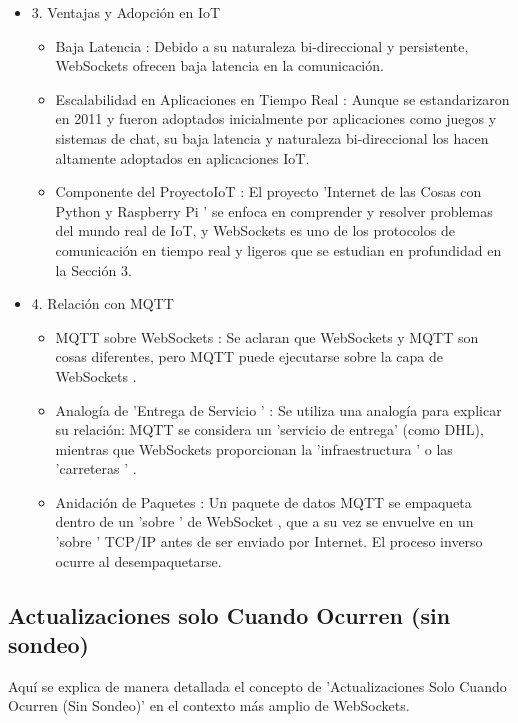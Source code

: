 \documentclass{report}
\begin{document}
\begin{itemize}
    \item 3. Ventajas y Adopción en IoT
    \begin{itemize}
        \item  Baja Latencia : Debido a su naturaleza bi-direccional y persistente, WebSockets ofrecen  baja latencia  en la comunicación.
        \item  Escalabilidad en Aplicaciones en Tiempo Real : Aunque se estandarizaron en 2011 y fueron adoptados inicialmente por aplicaciones 
        como juegos y sistemas de chat, su  baja latencia y naturaleza bi-direccional  los hacen altamente adoptados en aplicaciones IoT.
        \item  Componente del ProyectoIoT : El proyecto  'Internet de las Cosas con Python y Raspberry Pi ' se enfoca en comprender y resolver 
        problemas del mundo real de IoT, y WebSockets es uno de los  protocolos de comunicación en tiempo real y ligeros  que se estudian en 
        profundidad en la Sección 3.
    \end{itemize}

    \item 4. Relación con MQTT
    \begin{itemize}
        \item  MQTT sobre WebSockets : Se aclaran que WebSockets y MQTT son cosas diferentes, pero  MQTT puede ejecutarse sobre la capa de 
        WebSockets .
        \item  Analogía de  'Entrega de Servicio ' : Se utiliza una analogía para explicar su relación: MQTT se considera un  'servicio de entrega' 
        (como DHL), mientras que  WebSockets proporcionan la  'infraestructura ' o las  'carreteras ' .
        \item  Anidación de Paquetes : Un paquete de datos MQTT se  empaqueta dentro de un  'sobre ' de WebSocket , que a su vez se envuelve en un 
        'sobre ' TCP/IP antes de ser enviado por Internet. El proceso inverso ocurre al desempaquetarse.
    \end{itemize}
\end{itemize}

\subsection{Actualizaciones solo Cuando Ocurren (sin sondeo)}
Aquí se explica de manera detallada el concepto de 'Actualizaciones Solo Cuando Ocurren (Sin Sondeo)'  
en el contexto más amplio de  WebSockets.
\end{document}
